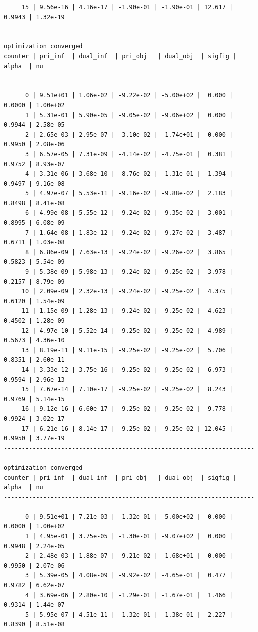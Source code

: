 \documentclass[
]{book}
\begin{document}
\begin{verbatim}
     15 | 9.56e-16 | 4.16e-17 | -1.90e-01 | -1.90e-01 | 12.617 | 0.9943 | 1.32e-19
----------------------------------------------------------------------------------
optimization converged
counter | pri_inf  | dual_inf  | pri_obj   | dual_obj  | sigfig | alpha  | nu 
----------------------------------------------------------------------------------
      0 | 9.51e+01 | 1.06e-02 | -9.22e-02 | -5.00e+02 |  0.000 | 0.0000 | 1.00e+02
      1 | 5.31e-01 | 5.90e-05 | -9.05e-02 | -9.06e+02 |  0.000 | 0.9944 | 2.58e-05
      2 | 2.65e-03 | 2.95e-07 | -3.10e-02 | -1.74e+01 |  0.000 | 0.9950 | 2.08e-06
      3 | 6.57e-05 | 7.31e-09 | -4.14e-02 | -4.75e-01 |  0.381 | 0.9752 | 8.93e-07
      4 | 3.31e-06 | 3.68e-10 | -8.76e-02 | -1.31e-01 |  1.394 | 0.9497 | 9.16e-08
      5 | 4.97e-07 | 5.53e-11 | -9.16e-02 | -9.88e-02 |  2.183 | 0.8498 | 8.41e-08
      6 | 4.99e-08 | 5.55e-12 | -9.24e-02 | -9.35e-02 |  3.001 | 0.8995 | 6.08e-09
      7 | 1.64e-08 | 1.83e-12 | -9.24e-02 | -9.27e-02 |  3.487 | 0.6711 | 1.03e-08
      8 | 6.86e-09 | 7.63e-13 | -9.24e-02 | -9.26e-02 |  3.865 | 0.5823 | 5.54e-09
      9 | 5.38e-09 | 5.98e-13 | -9.24e-02 | -9.25e-02 |  3.978 | 0.2157 | 8.79e-09
     10 | 2.09e-09 | 2.32e-13 | -9.24e-02 | -9.25e-02 |  4.375 | 0.6120 | 1.54e-09
     11 | 1.15e-09 | 1.28e-13 | -9.24e-02 | -9.25e-02 |  4.623 | 0.4502 | 1.28e-09
     12 | 4.97e-10 | 5.52e-14 | -9.25e-02 | -9.25e-02 |  4.989 | 0.5673 | 4.36e-10
     13 | 8.19e-11 | 9.11e-15 | -9.25e-02 | -9.25e-02 |  5.706 | 0.8351 | 2.60e-11
     14 | 3.33e-12 | 3.75e-16 | -9.25e-02 | -9.25e-02 |  6.973 | 0.9594 | 2.96e-13
     15 | 7.67e-14 | 7.10e-17 | -9.25e-02 | -9.25e-02 |  8.243 | 0.9769 | 5.14e-15
     16 | 9.12e-16 | 6.60e-17 | -9.25e-02 | -9.25e-02 |  9.778 | 0.9924 | 3.02e-17
     17 | 6.21e-16 | 8.14e-17 | -9.25e-02 | -9.25e-02 | 12.045 | 0.9950 | 3.77e-19
----------------------------------------------------------------------------------
optimization converged
counter | pri_inf  | dual_inf  | pri_obj   | dual_obj  | sigfig | alpha  | nu 
----------------------------------------------------------------------------------
      0 | 9.51e+01 | 7.21e-03 | -1.32e-01 | -5.00e+02 |  0.000 | 0.0000 | 1.00e+02
      1 | 4.95e-01 | 3.75e-05 | -1.30e-01 | -9.07e+02 |  0.000 | 0.9948 | 2.24e-05
      2 | 2.48e-03 | 1.88e-07 | -9.21e-02 | -1.68e+01 |  0.000 | 0.9950 | 2.07e-06
      3 | 5.39e-05 | 4.08e-09 | -9.92e-02 | -4.65e-01 |  0.477 | 0.9782 | 6.62e-07
      4 | 3.69e-06 | 2.80e-10 | -1.29e-01 | -1.67e-01 |  1.466 | 0.9314 | 1.44e-07
      5 | 5.95e-07 | 4.51e-11 | -1.32e-01 | -1.38e-01 |  2.227 | 0.8390 | 8.51e-08

\end{verbatim}
\end{document}
